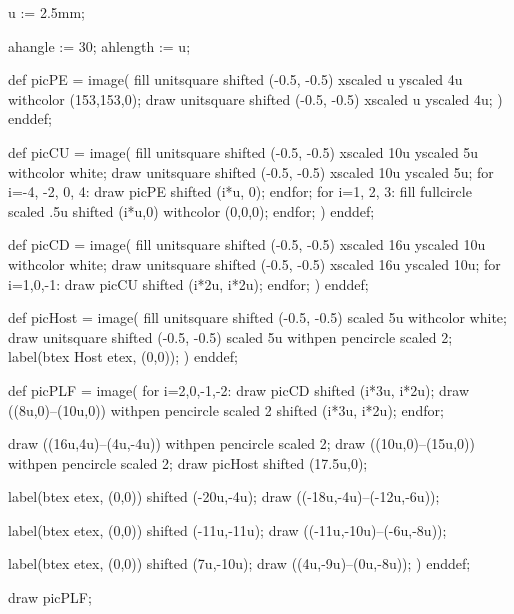 u := 2.5mm;

ahangle := 30;
ahlength := u;

def picPE =
image(
fill unitsquare shifted (-0.5, -0.5) xscaled u yscaled 4u withcolor (153,153,0);
draw unitsquare shifted (-0.5, -0.5) xscaled u yscaled 4u;
)
enddef;

def picCU =
image(
fill unitsquare shifted (-0.5, -0.5) xscaled 10u yscaled 5u withcolor white;
draw unitsquare shifted (-0.5, -0.5) xscaled 10u yscaled 5u;
for i=-4, -2, 0, 4:
	draw picPE shifted (i*u, 0);
endfor;
for i=1, 2, 3:
	fill fullcircle scaled .5u shifted (i*u,0) withcolor (0,0,0);
endfor;
)
enddef;

def picCD =
image(
fill unitsquare shifted (-0.5, -0.5) xscaled 16u yscaled 10u withcolor white;
draw unitsquare shifted (-0.5, -0.5) xscaled 16u yscaled 10u;
for i=1,0,-1:
	draw picCU shifted (i*2u, i*2u);
endfor;
)
enddef;

def picHost =
image(
fill unitsquare shifted (-0.5, -0.5) scaled 5u withcolor white;
draw unitsquare shifted (-0.5, -0.5) scaled 5u withpen pencircle scaled 2;
label(btex Host etex, (0,0));
)
enddef;

def picPLF =
image(
for i=2,0,-1,-2:
	draw picCD shifted (i*3u, i*2u);
	draw ((8u,0)--(10u,0)) withpen pencircle scaled 2 shifted (i*3u, i*2u);
endfor;

draw ((16u,4u)--(4u,-4u)) withpen pencircle scaled 2;
draw ((10u,0)--(15u,0)) withpen pencircle scaled 2;
draw picHost shifted (17.5u,0);

label(btex  etex, (0,0)) shifted (-20u,-4u);
draw ((-18u,-4u)--(-12u,-6u));

label(btex  etex, (0,0)) shifted (-11u,-11u);
draw ((-11u,-10u)--(-6u,-8u));

label(btex  etex, (0,0)) shifted (7u,-10u);
draw ((4u,-9u)--(0u,-8u));
)
enddef;

draw picPLF;

\stopreusableMPgraphic
